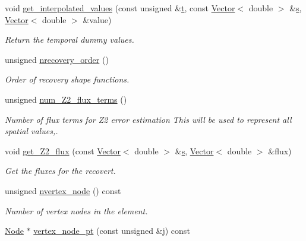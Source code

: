 \begin{DoxyCompactItemize}
void \hyperlink{classoomph_1_1SpectralPeriodicOrbitElement_a49dfdd0687d3a3ad27c1ae9e9074aea9}{get\+\_\+interpolated\+\_\+values} (const unsigned \&\hyperlink{cfortran_8h_af6f0bd3dc13317f895c91323c25c2b8f}{t}, const \hyperlink{classoomph_1_1Vector}{Vector}$<$ double $>$ \&\hyperlink{cfortran_8h_ab7123126e4885ef647dd9c6e3807a21c}{s}, \hyperlink{classoomph_1_1Vector}{Vector}$<$ double $>$ \&value)
\begin{DoxyCompactList}\small\item\em Return the temporal dummy values. \end{DoxyCompactList}\item 
unsigned \hyperlink{classoomph_1_1SpectralPeriodicOrbitElement_a38c80629b1befeb65014659c7e14ab09}{nrecovery\+\_\+order} ()
\begin{DoxyCompactList}\small\item\em Order of recovery shape functions. \end{DoxyCompactList}\item 
unsigned \hyperlink{classoomph_1_1SpectralPeriodicOrbitElement_a625465ff6702c623efd252d758832445}{num\+\_\+\+Z2\+\_\+flux\+\_\+terms} ()
\begin{DoxyCompactList}\small\item\em Number of flux terms for Z2 error estimation This will be used to represent all spatial values,. \end{DoxyCompactList}\item 
void \hyperlink{classoomph_1_1SpectralPeriodicOrbitElement_aee2d7222e52f4d59692b8f1ac3964b17}{get\+\_\+\+Z2\+\_\+flux} (const \hyperlink{classoomph_1_1Vector}{Vector}$<$ double $>$ \&\hyperlink{cfortran_8h_ab7123126e4885ef647dd9c6e3807a21c}{s}, \hyperlink{classoomph_1_1Vector}{Vector}$<$ double $>$ \&flux)
\begin{DoxyCompactList}\small\item\em Get the fluxes for the recovert. \end{DoxyCompactList}\item 
unsigned \hyperlink{classoomph_1_1SpectralPeriodicOrbitElement_a3ec38d16dfb22d1e7090b230db3479d5}{nvertex\+\_\+node} () const
\begin{DoxyCompactList}\small\item\em Number of vertex nodes in the element. \end{DoxyCompactList}\item 
\hyperlink{classoomph_1_1Node}{Node} $\ast$ \hyperlink{classoomph_1_1SpectralPeriodicOrbitElement_a1bcd63d9abbf001bf4beb903a18dfc2e}{vertex\+\_\+node\+\_\+pt} (const unsigned \&j) const

\end{DoxyCompactItemize}
